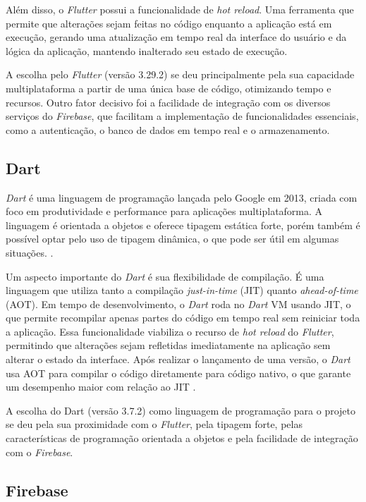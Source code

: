 Além disso, o \textit{Flutter} possui a funcionalidade de \textit{hot reload}. Uma ferramenta que permite que alterações sejam feitas no código enquanto a aplicação está em execução, gerando uma atualização em tempo real da interface do usuário e da lógica da aplicação, 
mantendo inalterado seu estado de execução.

A escolha pelo \textit{Flutter} (versão 3.29.2) se deu principalmente pela sua capacidade multiplataforma a partir de uma única base de código, otimizando tempo e recursos. Outro fator decisivo foi a facilidade de integração com os diversos serviços do \textit{Firebase}, 
que facilitam a implementação de funcionalidades essenciais, como a autenticação, o banco de dados em tempo real e o armazenamento.

\subsection{Dart}

\textit{Dart} é uma linguagem de programação lançada pelo Google em 2013, criada com foco em produtividade e performance para aplicações multiplataforma. A linguagem é orientada a objetos e oferece tipagem estática forte, porém também é possível optar pelo uso de tipagem dinâmica, 
o que pode ser útil em algumas situações. \cite{dartDocs2025}.

Um aspecto importante do \textit{Dart} é sua flexibilidade de compilação. É uma linguagem que utiliza tanto a compilação \textit{just-in-time} (JIT) quanto \textit{ahead-of-time} (AOT). 
Em tempo de desenvolvimento, o \textit{Dart} roda no \textit{Dart} VM usando JIT, o que permite recompilar apenas partes do código em tempo real sem reiniciar toda a aplicação. Essa funcionalidade viabiliza o recurso de \textit{hot reload} do \textit{Flutter}, permitindo que alterações sejam refletidas imediatamente na aplicação sem alterar o estado da interface. Após realizar o lançamento de uma versão, o \textit{Dart} usa AOT para compilar o código diretamente para código nativo, o que garante um desempenho maior com relação ao JIT \cite{dartDocs2025}.

A escolha do Dart (versão 3.7.2) como linguagem de programação para o projeto se deu pela sua proximidade com o \textit{Flutter}, pela tipagem forte, pelas características de programação orientada a objetos e pela facilidade de integração com o \textit{Firebase}.

\subsection{Firebase}

